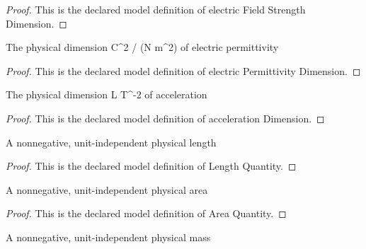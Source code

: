 \begin{proof}
  This is the declared model definition of electric Field Strength Dimension.
\end{proof}
\begin{definition}
  \label{def:physics:phyx-mini-0908:phyxminiproblems-problemphyxmini0908-electricpermittivitydimension}
  The physical dimension C\textasciicircum{}2 / (N m\textasciicircum{}2) of electric permittivity
\end{definition}
\begin{proof}
  This is the declared model definition of electric Permittivity Dimension.
\end{proof}
\begin{definition}
  \label{def:physics:phyx-mini-0908:phyxminiproblems-problemphyxmini0908-accelerationdimension}
  The physical dimension L T\textasciicircum{}-2 of acceleration
\end{definition}
\begin{proof}
  This is the declared model definition of acceleration Dimension.
\end{proof}
\begin{definition}
  \label{def:physics:phyx-mini-0908:phyxminiproblems-problemphyxmini0908-lengthquantity}
  A nonnegative, unit-independent physical length
\end{definition}
\begin{proof}
  This is the declared model definition of Length Quantity.
\end{proof}
\begin{definition}
  \label{def:physics:phyx-mini-0908:phyxminiproblems-problemphyxmini0908-areaquantity}
  A nonnegative, unit-independent physical area
\end{definition}
\begin{proof}
  This is the declared model definition of Area Quantity.
\end{proof}
\begin{definition}
  \label{def:physics:phyx-mini-0908:phyxminiproblems-problemphyxmini0908-massquantity}
  A nonnegative, unit-independent physical mass
\end{definition}
